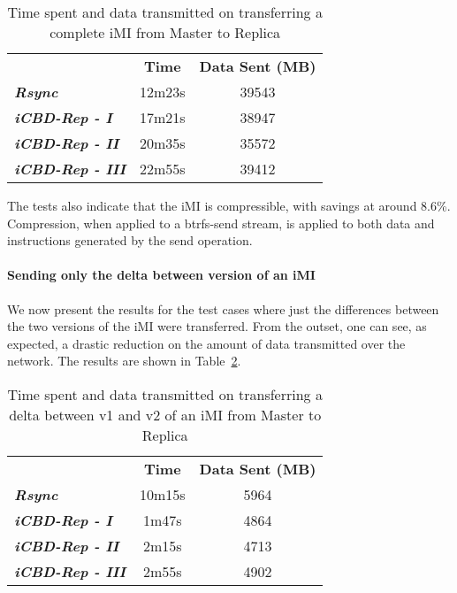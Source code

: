 \begin{table}[h]
\centering
\begin{tabular}{lcc}
 & \textbf{Time} & \textbf{Data Sent (MB)} \\ \cline{2-3} 
\textit{\textbf{Rsync}} & 12m23s & 39543 \\
\textit{\textbf{iCBD-Rep - I}} & 17m21s & 38947 \\
\textit{\textbf{iCBD-Rep - II}} & 20m35s & 35572 \\
\textit{\textbf{iCBD-Rep - III}} & 22m55s & 39412
\end{tabular}
\caption{Time spent and data transmitted on transferring a complete iMI from Master to Replica}
\label{tab:eval_imifull}
\end{table}

The tests also indicate that the iMI is compressible, with savings at around 8.6\%. Compression, when applied to a btrfs-send stream, is applied to both data and instructions generated by the send operation.



\paragraph{Sending only the delta between version of an iMI}
\label{par:eval_iMI_delta}

We now present the results for the test cases where just the differences between the two versions of the iMI were transferred. From the outset, one can see, as expected, a drastic reduction on the amount of data transmitted over the network. The results are shown in Table~\ref{tab:eval_imidelta}.

\begin{table}[h]
\centering
\begin{tabular}{lcc}
 & \textbf{Time} & \textbf{Data Sent (MB)} \\ \cline{2-3} 
\textit{\textbf{Rsync}} & 10m15s & 5964 \\
\textit{\textbf{iCBD-Rep - I}} & 1m47s & 4864 \\
\textit{\textbf{iCBD-Rep - II}} & 2m15s & 4713 \\
\textit{\textbf{iCBD-Rep - III}} & 2m55s & 4902
\end{tabular}
\caption{Time spent and data transmitted on transferring a delta between v1 and v2 of an iMI from Master to Replica}
\label{tab:eval_imidelta}
\end{table}

